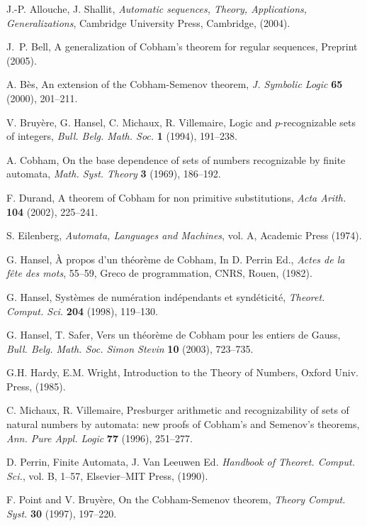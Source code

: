 \documentclass{beatcs}
\begin{document}
\begin{thebibliography}{99}
  
 J.-P. Allouche, J. Shallit, {\it Automatic sequences,
    Theory, Applications, Generalizations}, Cambridge University
  Press, Cambridge, (2004).
  
 J.~P. Bell, A generalization of Cobham's theorem for
  regular sequences, Preprint (2005).
  
 A. B\`es, An extension of the Cobham-Semenov theorem,
  {\it J. Symbolic Logic} {\bf 65} (2000), 201--211.
  
 V. Bruy\`ere, G. Hansel, C. Michaux, R. Villemaire,
  Logic and $p$-recognizable sets of integers, {\it Bull. Belg. Math.
    Soc.} {\bf 1} (1994), 191--238.
  
 A. Cobham, On the base dependence of sets of numbers
  recognizable by finite automata, {\it Math. Syst. Theory} {\bf 3}
  (1969), 186--192.

 F. Durand, A theorem of Cobham for non primitive
  substitutions, {\it Acta Arith.} {\bf 104} (2002), 225--241.
  
 S. Eilenberg, {\it Automata, Languages and Machines},
  vol. A, Academic Press (1974).

 G. Hansel, \`A propos d'un th\'eor\`eme de Cobham, In D.
  Perrin Ed., {\it Actes de la f\^ete des mots}, 55--59, Greco de
  programmation, CNRS, Rouen, (1982).
  
 G. Hansel, Syst\`emes de num\'eration ind\'ependants et
  synd\'eticit\'e, {\it Theoret. Comput. Sci.} {\bf 204} (1998),
  119--130.
  
 G. Hansel, T. Safer, Vers un th\'eor\`eme de Cobham pour
  les entiers de Gauss, {\it Bull. Belg. Math. Soc.  Simon Stevin}
  {\bf 10} (2003), 723--735.
  
 G.H. Hardy, E.M. Wright, Introduction to the Theory of
  Numbers, Oxford Univ. Press, (1985).
  
 C. Michaux, R. Villemaire, Presburger arithmetic and
  recognizability of sets of natural numbers by automata: new proofs
  of Cobham's and Semenov's theorems, {\it Ann. Pure Appl. Logic} {\bf
    77} (1996), 251--277.
  
 D. Perrin, Finite Automata, J. Van Leeuwen Ed.
  {\it Handbook of Theoret. Comput. Sci.}, vol. B, 1--57,
  Elsevier--MIT Press, (1990).
  
 F. Point and V. Bruy\`ere, On the Cobham-Semenov theorem,
  {\it Theory Comput. Syst.} {\bf 30} (1997), 197--220.
  
\end{thebibliography}
\end{document}
